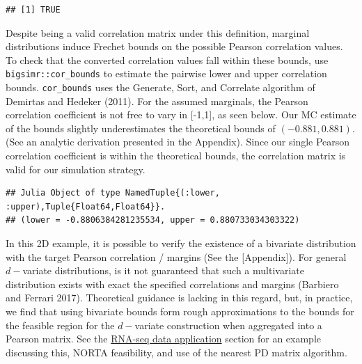 \documentclass{article}
\newenvironment{Shaded}{\begin{snugshade}}{\end{snugshade}}
\newcommand{\AttributeTok}[1]{\textcolor[rgb]{0.77,0.63,0.00}{#1}}
\newcommand{\DecValTok}[1]{\textcolor[rgb]{0.00,0.00,0.81}{#1}}
\newcommand{\FloatTok}[1]{\textcolor[rgb]{0.00,0.00,0.81}{#1}}
\newcommand{\FunctionTok}[1]{\textcolor[rgb]{0.00,0.00,0.00}{#1}}
\newcommand{\NormalTok}[1]{#1}
\newcommand{\SpecialCharTok}[1]{\textcolor[rgb]{0.00,0.00,0.00}{#1}}
\begin{document}
\begin{verbatim}
## [1] TRUE
\end{verbatim}

Despite being a valid correlation matrix under this definition, marginal
distributions induce Frechet bounds on the possible Pearson correlation
values. To check that the converted correlation values fall within these
bounds, use \texttt{bigsimr::cor\_bounds} to estimate the pairwise lower
and upper correlation bounds. \texttt{cor\_bounds} uses the Generate,
Sort, and Correlate algorithm of Demirtas and Hedeker (2011). For the
assumed marginals, the Pearson correlation coefficient is not free to
vary in {[}-1,1{]}, as seen below. Our MC estimate of the bounds
slightly underestimates the theoretical bounds of \((-0.881, 0.881)\).
(See an analytic derivation presented in the Appendix). Since our single
Pearson correlation coefficient is within the theoretical bounds, the
correlation matrix is valid for our simulation strategy.

\begin{Shaded}
\end{Shaded}

\begin{verbatim}
## Julia Object of type NamedTuple{(:lower, :upper),Tuple{Float64,Float64}}.
## (lower = -0.8806384281235534, upper = 0.880733034303322)
\end{verbatim}

In this 2D example, it is possible to verify the existence of a
bivariate distribution with the target Pearson correlation / margins
(See the {[}Appendix{]}). For general \(d-\)variate distributions, is it
not guaranteed that such a multivariate distribution exists with exact
the specified correlations and margins (Barbiero and Ferrari 2017).
Theoretical guidance is lacking in this regard, but, in practice, we
find that using bivariate bounds form rough approximations to the bounds
for the feasible region for the \(d-\)variate construction when
aggregated into a Pearson matrix. See the
\protect\hyperlink{examples}{RNA-seq data application} section for an
example discussing this, NORTA feasibility, and use of the nearest PD
matrix algorithm.
\end{document}
